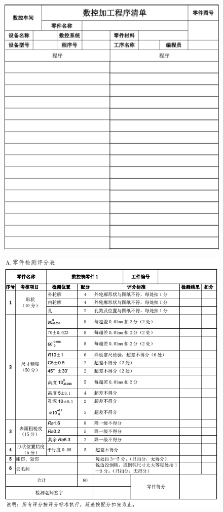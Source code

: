 \begin{figure}
	\centering
	\includegraphics[width=0.9\linewidth]{images/1-7}
	\caption{}
	\label{fig:1-1}
\end{figure}
\begin{figure}
	\centering
	\includegraphics[width=0.9\linewidth]{images/1-8}
	\caption{}
	\label{fig:1-1}
\end{figure}
